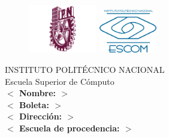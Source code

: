 \documentclass{article}
\newcommand{\placeholder}[1]{\textbf{$<$ #1 $>$}}
\newcommand{\nombre}{\placeholder{Nombre: }}
\newcommand{\boleta}{\placeholder{Boleta: }}
\newcommand{\direccion}{\placeholder{Dirección: }}
\newcommand{\escproc}{\placeholder{Escuela de procedencia: }}
\begin{document}
    \begin{titlepage}
        \begin{center}
            \vspace*{-1in}
            \begin{figure}[htb]
                \centering
                \includegraphics[width= 3cm]{./ipn.png}\hspace{9 cm}
                \includegraphics[width= 2.5cm]{./escom.png}
            \end{figure}
        \end{center}
        \begin{center}
            \LARGE{INSTITUTO POLITÉCNICO NACIONAL}\\
            \Large{Escuela Superior de Cómputo}\\
            \vspace*{5 cm}
            \nombre{} \\
            \boleta{} \\
            \direccion{}\\
            \escproc{}\\
        \end{center}
    \end{titlepage}
\end{document}
